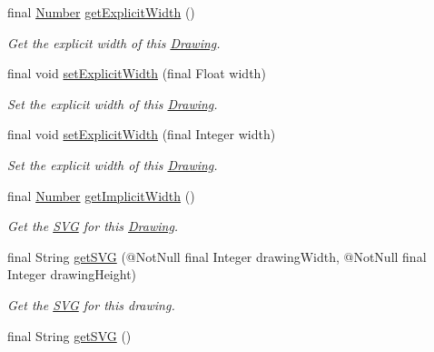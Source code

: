 \begin{DoxyCompactItemize}
final \hyperlink{interfacecom_1_1aarrelaakso_1_1drawl_1_1_number}{Number} \hyperlink{classcom_1_1aarrelaakso_1_1drawl_1_1_drawing_a0de258c25c1d13e3c2d71ab6a90606ef}{get\+Explicit\+Width} ()
\begin{DoxyCompactList}\small\item\em Get the explicit width of this \hyperlink{classcom_1_1aarrelaakso_1_1drawl_1_1_drawing}{Drawing}. \end{DoxyCompactList}\item 
final void \hyperlink{classcom_1_1aarrelaakso_1_1drawl_1_1_drawing_a94179f3b7c6b4619a2b86cc9f7716a77}{set\+Explicit\+Width} (final Float width)
\begin{DoxyCompactList}\small\item\em Set the explicit width of this \hyperlink{classcom_1_1aarrelaakso_1_1drawl_1_1_drawing}{Drawing}. \end{DoxyCompactList}\item 
final void \hyperlink{classcom_1_1aarrelaakso_1_1drawl_1_1_drawing_ac3b714abeb0f6132196b8a1e50b6de41}{set\+Explicit\+Width} (final Integer width)
\begin{DoxyCompactList}\small\item\em Set the explicit width of this \hyperlink{classcom_1_1aarrelaakso_1_1drawl_1_1_drawing}{Drawing}. \end{DoxyCompactList}\item 
final \hyperlink{interfacecom_1_1aarrelaakso_1_1drawl_1_1_number}{Number} \hyperlink{classcom_1_1aarrelaakso_1_1drawl_1_1_drawing_a67991c78d1f4989b0422b6cc36d339fe}{get\+Implicit\+Width} ()
\begin{DoxyCompactList}\small\item\em Get the \hyperlink{classcom_1_1aarrelaakso_1_1drawl_1_1_s_v_g}{S\+VG} for this \hyperlink{classcom_1_1aarrelaakso_1_1drawl_1_1_drawing}{Drawing}. \end{DoxyCompactList}\item 
final String \hyperlink{classcom_1_1aarrelaakso_1_1drawl_1_1_drawing_ac005562185c059c5cd14a1df92b335d6}{get\+S\+VG} (@Not\+Null final Integer drawing\+Width, @Not\+Null final Integer drawing\+Height)
\begin{DoxyCompactList}\small\item\em Get the \hyperlink{classcom_1_1aarrelaakso_1_1drawl_1_1_s_v_g}{S\+VG} for this drawing. \end{DoxyCompactList}\item 
final String \hyperlink{classcom_1_1aarrelaakso_1_1drawl_1_1_drawing_ada7c8b8df06ba84c1334e98751730500}{get\+S\+VG} ()

\end{DoxyCompactItemize}
